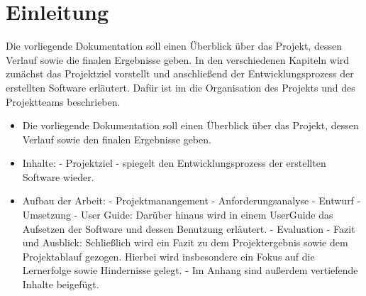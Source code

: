 \chapter{Einleitung}
Die vorliegende Dokumentation soll einen Überblick über das Projekt, dessen Verlauf sowie die finalen Ergebnisse geben.
In den verschiedenen Kapiteln wird zunächst das Projektziel vorstellt und anschließend der Entwicklungsprozess der erstellten Software erläutert.
Dafür ist im \nameref{} die Organisation des Projekts und des Projektteams beschrieben.

\begin{itemize}
    \item Die vorliegende Dokumentation soll einen Überblick über das Projekt, dessen Verlauf sowie den finalen Ergebnisse geben.     \item Inhalte:
        \subitem - Projektziel
        \subitem - spiegelt den Entwicklungsprozess der erstellten Software wieder.
    \item Aufbau der Arbeit: 
        \subitem - Projektmanangement
        \subitem - Anforderungsanalyse
        \subitem - Entwurf
        \subitem - Umsetzung
        \subitem - User Guide: Darüber hinaus wird in einem UserGuide das Aufsetzen der Software und dessen Benutzung erläutert.
        \subitem - Evaluation
        \subitem - Fazit und Ausblick: Schließlich wird ein Fazit zu dem Projektergebnis sowie dem Projektablauf gezogen. Hierbei wird insbesondere ein Fokus auf die Lernerfolge sowie Hindernisse gelegt. 
        \subitem - Im Anhang sind außerdem vertiefende Inhalte beigefügt.
\end{itemize}